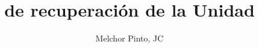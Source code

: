 \documentclass[examen]{RDS_unit}
\title{de recuperación de la Unidad}
\author{Melchor Pinto, JC}
\begin{document}
\begin{questions}

\end{questions}
\end{document}
